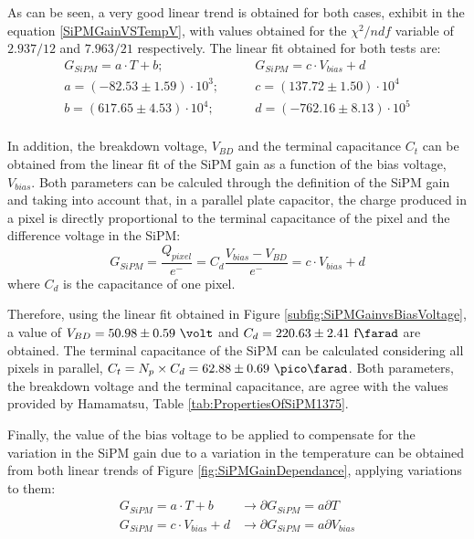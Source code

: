 As can be seen, a very good linear trend is obtained for both cases, exhibit in the equation \ref{SiPMGainVSTempV}, with values obtained for the $\chi^2/ndf$ variable of $2.937/12$ and $7.963/21$ respectively. The linear fit obtained for both tests are:
\begin{equation*}
\begin{split}
G_{SiPM}=a \cdot{} T + b;& \qquad G_{SiPM}=c \cdot{} V_{bias} + d\\
a=\left( -82.53 \pm 1.59 \right) \cdot{} 10^{3};& \qquad c=\left( 137.72 \pm 1.50 \right) \cdot{} 10^{4}\\
b=\left( 617.65 \pm 4.53 \right) \cdot{} 10^{4};& \qquad d=\left( -762.16 \pm 8.13 \right) \cdot{} 10^{5} \\
\label{SiPMGainVSTempV}
\end{split}
\end{equation*} 

In addition, the breakdown voltage, $V_{BD}$ and the terminal capacitance $C_t$ can be obtained from the linear fit of the SiPM gain as a function of the bias voltage, $V_{bias}$. Both parameters can be calculed through the definition of the SiPM gain and taking into account that, in a parallel plate capacitor, the charge produced in a pixel is directly proportional to the terminal capacitance of the pixel and the difference voltage in the SiPM:
\begin{equation}
G_{SiPM}=\frac{Q_{pixel}}{e^-} = C_d \frac{V_{bias}-V_{BD}}{e^-} = c \cdot{} V_{bias}+d
\label{SiPMGain_Capacitance}
\end{equation}
where $C_d$ is the capacitance of one pixel.

Therefore, using the linear fit obtained in Figure \ref{subfig:SiPMGainvsBiasVoltage}, a value of $V_{BD}=50.98 \pm 0.59~\volt$ and $C_d{}= 220.63 \pm 2.41~\text{f}\farad$ are obtained. The terminal capacitance of the SiPM can be calculated considering all pixels in parallel, $C_{t}=N_{p}\times C_{d}=62.88 \pm 0.69~\pico\farad$. Both parameters, the breakdown voltage and the terminal capacitance, are agree with the values provided by Hamamatsu, Table \ref{tab:PropertiesOfSiPM1375}. 

Finally, the value of the bias voltage to be applied to compensate for the variation in the SiPM gain due to a variation in the temperature can be obtained from both linear trends of Figure \ref{fig:SiPMGainDependance}, applying variations to them:
\begin{equation*}
\begin{split}
G_{SiPM}=a \cdot{} T + b  &\longrightarrow \partial G_{SiPM}= a \partial T\\
G_{SiPM}=c \cdot{} V_{bias} + d &\longrightarrow \partial G_{SiPM}= a \partial V_{bias}
\label{Gain_compensationVariations}
\end{split}
\end{equation*} 

